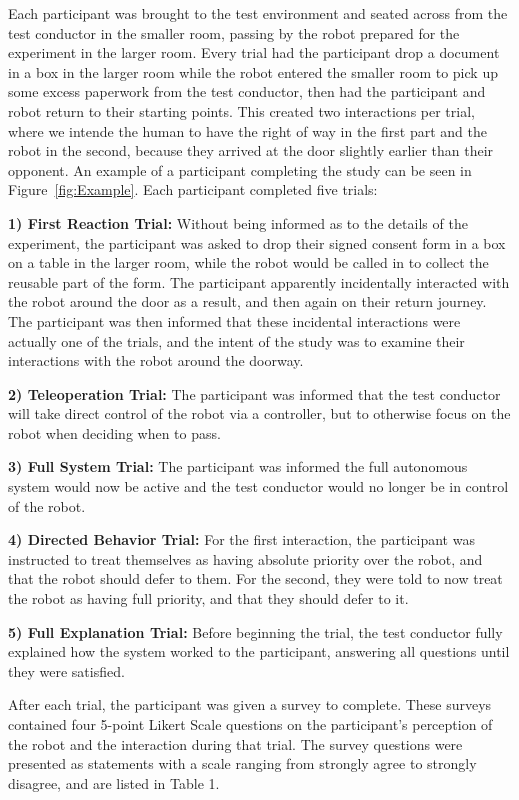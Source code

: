 \documentclass[letterpaper, 10 pt, conference]{ieeeconf}  %
\begin{document}
Each participant was brought to the test environment and seated across from the test conductor in the smaller room, passing by the robot prepared for the experiment in the larger room. Every trial had the participant drop a document in a box in the larger room while the robot entered the smaller room to pick up some excess paperwork from the test conductor, then had the participant and robot return to their starting points. This created two interactions per trial, where we intende the human to have the right of way in the first part and the robot in the second, because they arrived at the door slightly earlier than their opponent. An example of a participant completing the study can be seen in Figure~\ref{fig:Example}. Each participant completed five trials:

\textbf{1) First Reaction Trial:} Without being informed as to the details of the experiment, the participant was asked to drop their signed consent form in a box on a table in the larger room, while the robot would be called in to collect the reusable part of the form. The participant apparently incidentally interacted with the robot around the door as a result, and then again on their return journey. The participant was then informed that these incidental interactions were actually one of the trials, and the intent of the study was to examine their interactions with the robot around the doorway.

\textbf{2) Teleoperation Trial:} The participant was informed that the test conductor will take direct control of the robot via a controller, but to otherwise focus on the robot when deciding when to pass. 

\textbf{3) Full System Trial:} The participant was informed the full autonomous system would now be active and the test conductor would no longer be in control of the robot.

\textbf{4) Directed Behavior Trial:} For the first interaction, the participant was instructed to treat themselves as having absolute priority over the robot, and that the robot should defer to them. For the second, they were told to now treat the robot as having full priority, and that they should defer to it.

\textbf{5) Full Explanation Trial:} Before beginning the trial, the test conductor fully explained how the system worked to the participant, answering all questions until they were satisfied.

After each trial, the participant was given a survey to complete. These surveys contained four 5-point Likert Scale questions on the participant’s perception of the robot and the interaction during that trial. The survey questions were presented as statements with a scale ranging from strongly agree to strongly disagree, and are listed in Table 1.
\end{document}
